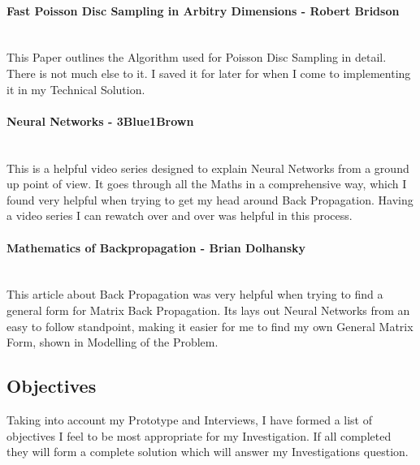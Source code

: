 \begin{flushleft}
                \paragraph*{Fast Poisson Disc Sampling in Arbitry Dimensions - Robert Bridson} \mbox{} \\
                    This Paper outlines the Algorithm used for Poisson Disc Sampling in detail. There is not much else to it. I saved it for later
                    for when I come to implementing it in my Technical Solution.

                \paragraph*{Neural Networks - 3Blue1Brown} \mbox{} \\
                    This is a helpful video series designed to explain Neural Networks from a ground up point of view. It goes through all the Maths
                    in a comprehensive way, which I found very helpful when trying to get my head around Back Propagation. Having a video series I
                    can rewatch over and over was helpful in this process.

                \paragraph*{Mathematics of Backpropagation - Brian Dolhansky} \mbox{} \\
                    This article about Back Propagation was very helpful when trying to find a general form for Matrix Back Propagation. Its lays
                    out Neural Networks from an easy to follow standpoint, making it easier for me to find my own General Matrix Form, shown in
                    Modelling of the Problem. 
        \subsection{Objectives}
            \large
            Taking into account my Prototype and Interviews, I have formed a list of objectives I feel to be most 
            appropriate for my Investigation. If all completed they will form a complete solution which will answer 
            my Investigations question.\\

            \renewcommand{\labelenumii}{\arabic{enumi}.\arabic{enumii}}
            \renewcommand{\labelenumiii}{\arabic{enumi}.\arabic{enumii}.\arabic{enumiii}}
            \renewcommand{\labelenumiv}{\arabic{enumi}.\arabic{enumii}.\arabic{enumiii}.\arabic{enumiv}}


\end{flushleft}

